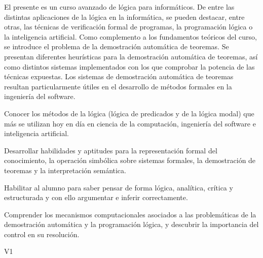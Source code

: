 \begin{syllabus}


\begin{justification}
El presente es un curso avanzado de lógica para informáticos. De
entre las distintas aplicaciones de la lógica en la informática, se
pueden destacar, entre otras, las técnicas de verificación formal de
programas, la programación lógica o la inteligencia artificial. Como
complemento a los fundamentos teóricos del curso, se introduce el
problema de la demostración automática de teoremas. Se presentan
diferentes heurísticas para la demostración automática de teoremas,
así como distintos sistemas implementados con los que comprobar la
potencia de las técnicas expuestas. Los sistemas de demostración
automática de teoremas resultan particularmente útiles en el
desarrollo de métodos formales en la ingeniería del software.
\end{justification}

\begin{goals}
\item Conocer los métodos de la lógica (lógica de predicados y de la lógica modal) que más se utilizan hoy en día en ciencia de la computación, ingeniería del software e inteligencia artificial. 
\item Desarrollar habilidades y aptitudes para la representación formal del conocimiento, la operación simbólica sobre sistemas formales, la demostración de teoremas y la interpretación semántica.
\item Habilitar al alumno para saber pensar de forma lógica, analítica, crítica y estructurada y con ello argumentar e inferir correctamente.
\item Comprender los mecanismos computacionales asociados a las problemáticas de la demostración automática y la programación lógica, y descubrir la importancia del control en su resolución.
\end{goals}

\begin{outcomes}{V1}
\end{outcomes}


\end{syllabus}
